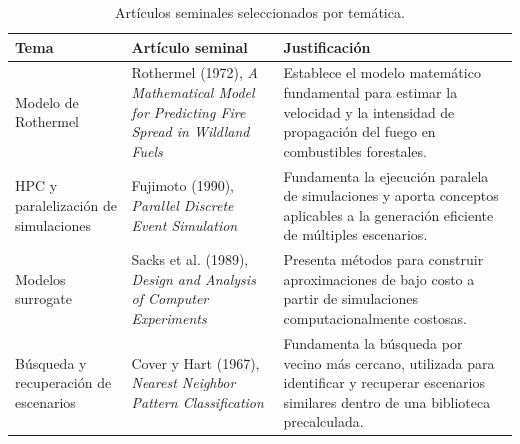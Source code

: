 \begin{table}[H]
    \centering
    \renewcommand{\arraystretch}{2.1}
    \begin{tabular}{p{3.2cm}p{5.2cm}p{5.2cm}}
        \toprule
        \textbf{Tema} & \textbf{Artículo seminal} & \textbf{Justificación} \\
        \midrule
        Modelo de Rothermel & Rothermel (1972), \textit{A Mathematical Model for Predicting Fire Spread in Wildland Fuels} & Establece el modelo matemático fundamental para estimar la velocidad y la intensidad de propagación del fuego en combustibles forestales. \\
        HPC y paralelización de simulaciones & Fujimoto (1990), \textit{Parallel Discrete Event Simulation} & Fundamenta la ejecución paralela de simulaciones y aporta conceptos aplicables a la generación eficiente de múltiples escenarios. \\
        Modelos surrogate & Sacks et al. (1989), \textit{Design and Analysis of Computer Experiments} & Presenta métodos para construir aproximaciones de bajo costo a partir de simulaciones computacionalmente costosas. \\
        Búsqueda y recuperación de escenarios & Cover y Hart (1967), \textit{Nearest Neighbor Pattern Classification} & Fundamenta la búsqueda por vecino más cercano, utilizada para identificar y recuperar escenarios similares dentro de una biblioteca precalculada. \\
        \bottomrule
    \end{tabular}
    \caption{Artículos seminales seleccionados por temática.}
\end{table}


